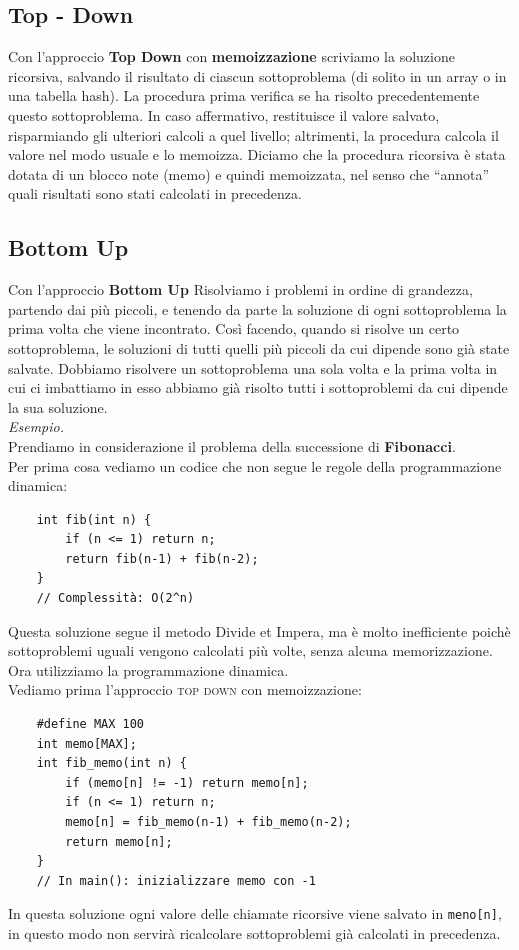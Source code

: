 \subsection{Top - Down}
Con l'approccio \textbf{Top Down} con \textbf{memoizzazione} scriviamo la soluzione ricorsiva, salvando il risultato di ciascun sottoproblema (di solito in un array o in una tabella hash). La procedura prima verifica se ha risolto precedentemente questo sottoproblema. In caso affermativo, restituisce il valore salvato, risparmiando gli ulteriori calcoli a quel livello; altrimenti, la procedura calcola il valore nel modo usuale e lo memoizza. Diciamo che la procedura ricorsiva è stata dotata di un blocco note (memo) e quindi memoizzata, nel senso che “annota” quali risultati sono stati calcolati in precedenza.
 

\subsection{Bottom Up}
Con l'approccio \textbf{Bottom Up} Risolviamo i problemi in ordine di grandezza, partendo dai più piccoli, e tenendo da parte la soluzione di ogni sottoproblema la prima volta che viene incontrato. Così facendo, quando si risolve un certo sottoproblema, le soluzioni di tutti quelli più piccoli da cui dipende sono già state salvate. Dobbiamo risolvere un sottoproblema una sola volta e la prima volta in cui ci imbattiamo in esso abbiamo già risolto tutti i sottoproblemi da cui dipende la sua soluzione.\bigskip\\


\noindent \textit{Esempio.}\\
Prendiamo in considerazione il problema della successione di \textbf{Fibonacci}.\\
Per prima cosa vediamo un codice che non segue le regole della programmazione dinamica:
\begin{verbatim}
    int fib(int n) {
        if (n <= 1) return n;
        return fib(n-1) + fib(n-2);
    }
    // Complessità: O(2^n)
\end{verbatim}
Questa soluzione segue il metodo Divide et Impera, ma è molto inefficiente poichè sottoproblemi uguali vengono calcolati più volte, senza alcuna memorizzazione.\medskip\\

\noindent Ora utilizziamo la programmazione dinamica.\\
Vediamo prima l'approccio \textsc{top down} con memoizzazione:
\begin{verbatim}
    #define MAX 100
    int memo[MAX];
    int fib_memo(int n) {
        if (memo[n] != -1) return memo[n];
        if (n <= 1) return n;
        memo[n] = fib_memo(n-1) + fib_memo(n-2);
        return memo[n];
    }
    // In main(): inizializzare memo con -1
\end{verbatim}
In questa soluzione ogni valore delle chiamate ricorsive viene salvato in \texttt{meno[n]}, in questo modo non servirà ricalcolare sottoproblemi già calcolati in precedenza.\smallskip\\

